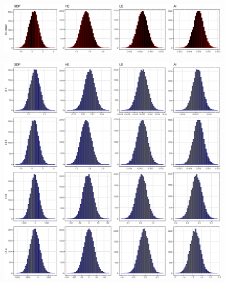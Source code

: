 \documentclass[11pt,preprint, authoryear]{elsarticle}
\let\origfigure\figure
\let\endorigfigure\endfigure
\renewenvironment{figure}[1][2] {
    \expandafter\origfigure\expandafter[H]
} {
    \endorigfigure
}
\numberwithin{equation}{section}
\numberwithin{figure}{section}
\numberwithin{table}{section}
\begin{document}
\begin{figure}
     \centering
     \begin{subfigure}[H]{0.49\textwidth}
         \centering
         \includegraphics[width=\textwidth]{minn_Constant.eps}
     \end{subfigure}
     \begin{subfigure}[H]{0.49\textwidth}
         \centering
         \includegraphics[width=\textwidth]{minn_CoefLag1.eps}
     \end{subfigure}
    \begin{subfigure}[H]{0.49\textwidth}
         \centering

\end{subfigure}
\end{figure}
\end{document}
